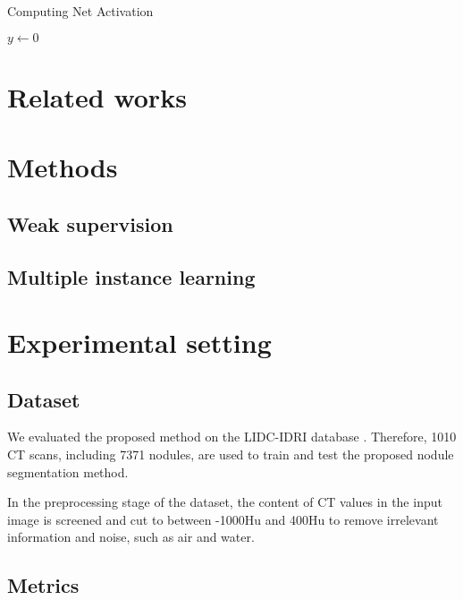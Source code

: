 \documentclass{midl} %
\begin{document}
\begin{algorithm2e}
\caption{Computing Net Activation}
\label{alg:net}
{}
$y\leftarrow 0$\;
\end{algorithm2e}

\section{Related works}

\cite{OShea:2023:WSS}
\cite{Feng:2017:WSS}
\cite{Feng:2023:WSS}

\section{Methods}

\subsection{Weak supervision}
\subsection{Multiple instance learning}

\section{Experimental setting}

\subsection{Dataset}

We evaluated the proposed method on the LIDC-IDRI database \cite{LIDC-IDRI}. Therefore, 1010 CT scans, including 7371 nodules, are used to train and test the proposed nodule segmentation method.

In the preprocessing stage of the dataset, the content of CT values in the input image is screened and cut to between -1000Hu and 400Hu to remove irrelevant information and noise, such as air and water.

\subsection{Metrics}
\end{document}
